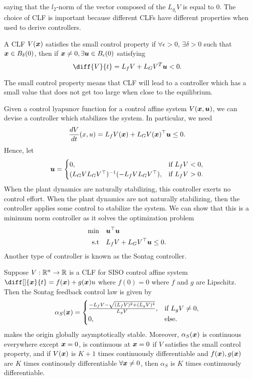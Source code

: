saying that the $l_2$-norm of the vector composed of the $L_{g_i} V$ is equal to
0. The choice of CLF is important because different CLFs have different
properties when used to derive controllers.
\begin{definition}
	A CLF $V(\boldsymbol{x})$ satisfies the small control property if $\forall \epsilon >
	0$, $\exists \delta > 0$ such that $\boldsymbol{x}\in B_\delta(0)$, then if
	$\boldsymbol{x}\neq0, \exists \boldsymbol{u}\in B_\epsilon(0)$ satisfying \[
		\diff{V}{t} = L_fV + L_GV^T\bs{u} < 0.
	\]
	\label{defn:small-control}
\end{definition}
The small control property means that CLF will lead to a controller which has a
small value that does not get too large when close to the equilibrium.

Given a control lyapunov function for a control affine system $V(\boldsymbol{x},
\boldsymbol{u})$, we can devise
a controller which stabilizes the system. In particular, we need \[
	\frac{dV}{dt}(x, u) = L_f V(\boldsymbol{x}) + L_GV(\boldsymbol{x})^\top \boldsymbol{u} \leq 0.
\]
Hence, let \[
	\boldsymbol{u} = \begin{cases}
		0, & \text{if } L_f V < 0,\\
		(L_GVL_GV^\top)^{-1}(-L_fV L_GV^\top), & \text{if } L_f V > 0.
	\end{cases}
\]
When the plant dynamics are naturally stabilizing, this controller exerts no
control effort. When the plant dynamics are not naturally stabilizing, then the
controller applies some control to stabilize the system. We can show that this
is a minimum norm controller as it solves the optimization problem \[
	\begin{aligned}
		\min &\quad \boldsymbol{u}^\top \boldsymbol{u}\\
		\text{s.t} &\quad L_fV + L_GV^\top \boldsymbol{u} \leq 0.
	\end{aligned}
\]
Another type of controller is known as the Sontag controller.
\begin{theorem}
	Suppose $V:\mathbb{R}^n\to\mathbb{R}$ is a CLF for SISO control affine system $\diff[]{\bs{x}}{t} =
	f(\bs{x}) + g(\bs{x})u$ where $f(0) = 0$ where $f$ and $g$ are Lipschitz. Then
	the Sontag feedback control law is given by \[
		\alpha_S(\boldsymbol{x}) = \begin{cases}
			\frac{-L_fV - \sqrt{(L_fV)^2 + (L_gV)^4}}{L_gV}, & \text{if } L_gV \neq
			0,\\
			0, & \text{else.}
		\end{cases}
	\]
	makes the origin globally asymptotically stable. Moreover,
	$\alpha_S(\boldsymbol{x})$ is continuous everywhere except $\boldsymbol{x} = 0$, is
	continuous at $\boldsymbol{x}=0$ if $V$ satisfies the small control property, and if
	$V(\boldsymbol{x})$ is $K+1$ times continuously differentiable and $f(\boldsymbol{x}),
	g(\boldsymbol{x})$ are $K$ times continously differentiable $\forall \boldsymbol{x}\neq0$,
	then $\alpha_S$ is $K$ times continuously differentiable.
	\label{thm:sontag}
\end{theorem}

